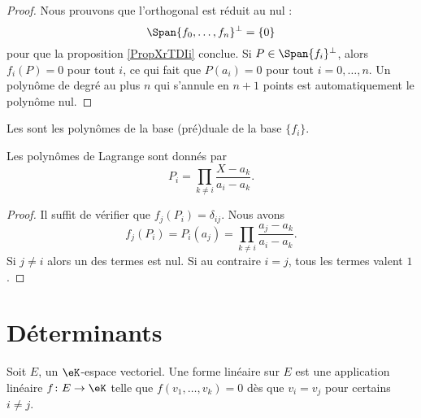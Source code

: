 \begin{proof}
    Nous prouvons que l'orthogonal est réduit au nul :
    \begin{equation}
        \Span\{ f_0,\ldots, f_n \}^{\perp}=\{ 0 \}
    \end{equation}
    pour que la proposition \ref{PropXrTDIi} conclue. Si \( P\in\Span\{ f_i \}^{\perp}\), alors \( f_i(P)=0\) pour tout \( i\), ce qui fait que \( P(a_i)=0\) pour tout \( i=0,\ldots, n\). Un polynôme de degré au plus \( n\) qui s'annule en \( n+1\) points est automatiquement le polynôme nul.
\end{proof}

Les  sont les polynômes de la base (pré)duale de la base \( \{ f_i \}\).

\begin{proposition}
    Les polynômes de Lagrange sont donnés par
    \begin{equation}
        P_i=\prod_{k\neq i}\frac{ X-a_k }{ a_i-a_k }.
    \end{equation}
\end{proposition}

\begin{proof}
    Il suffit de vérifier que \( f_j(P_i)=\delta_{ij}\). Nous avons
    \begin{equation}
        f_j(P_i)=P_i(a_j)=\prod_{k\neq i}\frac{ a_j-a_k }{ a_i-a_k }.
    \end{equation}
    Si \( j\neq i\) alors un des termes est nul. Si au contraire \( i=j\), tous les termes valent \( 1\).
\end{proof}

\section{Déterminants}
\label{SecGYzHWs}



\begin{definition}
    Soit \( E\), un \( \eK\)-espace vectoriel. Une forme linéaire  sur \( E\) est une application linéaire \( f\colon E\to \eK\) telle que \( f(v_1,\ldots, v_k)=0\) dès que \( v_i=v_j\) pour certains \( i\neq j\).
\end{definition}

